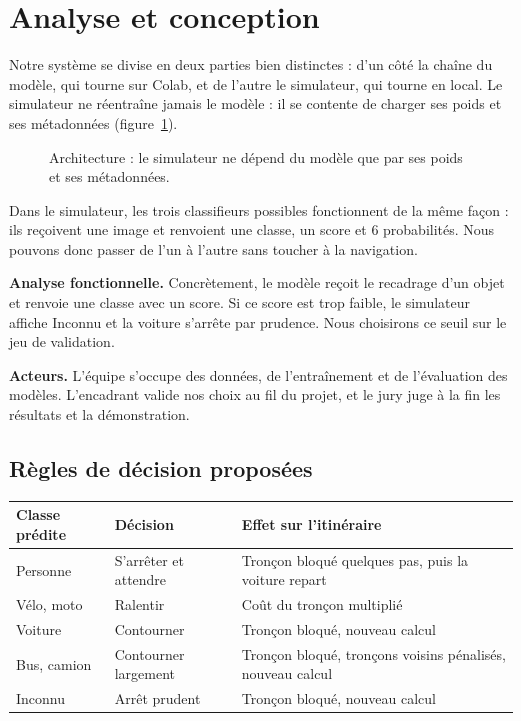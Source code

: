 \section{Analyse et conception}
\label{sec:conception}

Notre système se divise en deux parties bien distinctes : d'un côté la chaîne du modèle, qui tourne sur Colab, et de l'autre le simulateur, qui tourne en local. Le simulateur ne réentraîne jamais le modèle : il se contente de charger ses poids et ses métadonnées (figure~\ref{fig:architecture}).

\begin{figure}[H]
  \centering
  
  \caption{Architecture : le simulateur ne dépend du modèle que par ses poids et ses métadonnées.}
  \label{fig:architecture}
\end{figure}

Dans le simulateur, les trois classifieurs possibles fonctionnent de la même façon : ils reçoivent une image et renvoient une classe, un score et 6 probabilités. Nous pouvons donc passer de l'un à l'autre sans toucher à la navigation.

\textbf{Analyse fonctionnelle.} Concrètement, le modèle reçoit le recadrage d'un objet et renvoie une classe avec un score. Si ce score est trop faible, le simulateur affiche \og Inconnu \fg{} et la voiture s'arrête par prudence. Nous choisirons ce seuil sur le jeu de validation.

\textbf{Acteurs.} L'équipe s'occupe des données, de l'entraînement et de l'évaluation des modèles. L'encadrant valide nos choix au fil du projet, et le jury juge à la fin les résultats et la démonstration.

\subsection*{Règles de décision proposées}

\begin{center}
\begin{tabularx}{\textwidth}{>{\raggedright\arraybackslash}p{2.8cm}>{\raggedright\arraybackslash}p{4.2cm}Y}
  \toprule
  \textbf{Classe prédite} & \textbf{Décision} & \textbf{Effet sur l'itinéraire} \\
  \midrule
  Personne & S'arrêter et attendre & Tronçon bloqué quelques pas, puis la voiture repart \\
  Vélo, moto & Ralentir & Coût du tronçon multiplié \\
  Voiture & Contourner & Tronçon bloqué, nouveau calcul \\
  Bus, camion & Contourner largement & Tronçon bloqué, tronçons voisins pénalisés, nouveau calcul \\
  Inconnu & Arrêt prudent & Tronçon bloqué, nouveau calcul \\
  \bottomrule
\end{tabularx}
\end{center}


